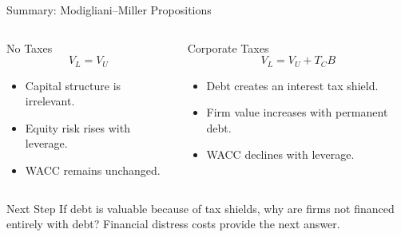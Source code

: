 \begin{frame}{Summary: Modigliani--Miller Propositions}

\begin{columns}[T,onlytextwidth]

\begin{block}{No Taxes}
\[
V_L = V_U
\]

\begin{itemize}
    \item Capital structure is irrelevant.
    \item Equity risk rises with leverage.
    \item WACC remains unchanged.
\end{itemize}
\end{block}

\begin{block}{Corporate Taxes}
\[
V_L = V_U + T_C B
\]

\begin{itemize}
    \item Debt creates an interest tax shield.
    \item Firm value increases with permanent debt.
    \item WACC declines with leverage.
\end{itemize}
\end{block}

\end{columns}

\vfill

\begin{alertblock}{Next Step}
If debt is valuable because of tax shields, why are firms not financed
entirely with debt? Financial distress costs provide the next answer.
\end{alertblock}

\end{frame}